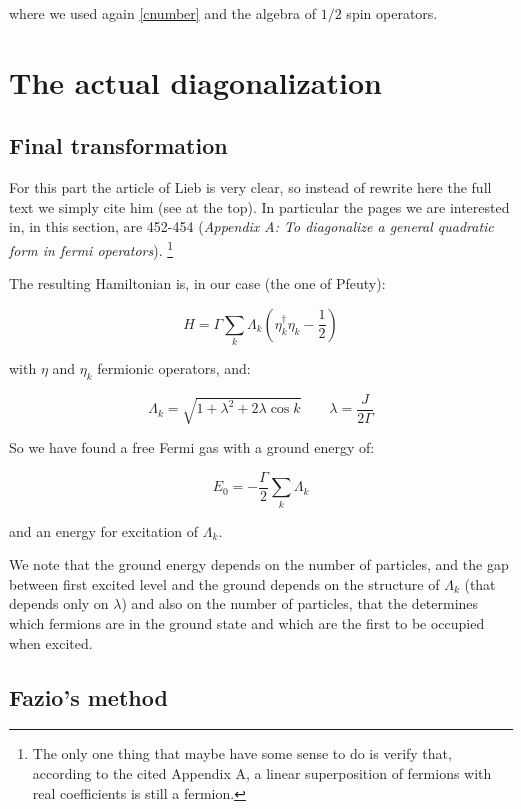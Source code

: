 \documentclass[a4paper,10pt]{article}
\begin{document}
\noindent where we used again \cref{cnumber} and the algebra of $1/2$ spin operators.

\section{The actual diagonalization}

\subsection{Final transformation}

For this part the article of Lieb is very clear, so instead of rewrite here the full text we simply cite him (see at the top). In particular the pages we are interested in, in this section, are 452-454 (\textit{Appendix A: To diagonalize a general quadratic form in fermi operators}).
\footnote{The only one thing that maybe have some sense to do is verify that, according to the cited Appendix A, a linear superposition of fermions with real coefficients is still a fermion.}

The resulting Hamiltonian is, in our case (the one of Pfeuty):

\begin{equation}
H = \Gamma \sum_k \Lambda_k (\eta_k^\dagger \eta_k - \frac{1}{2})
\end{equation}

\noindent with $\eta$ and $\eta_k$ fermionic operators, and:

\begin{equation}
\Lambda_k = \sqrt{1 + \lambda^2 + 2\lambda \cos k}	\qquad	\lambda = \frac{J}{2 \Gamma}
\end{equation}

So we have found a free Fermi gas with a ground energy of:

\begin{equation}
	E_0 = - \frac{\Gamma}{2} \sum_k \Lambda_k
\end{equation}

\noindent and an energy for excitation of $\Lambda_k$.

We note that the ground energy depends on the number of particles, and the gap between first excited level and the ground depends on the structure of $\Lambda_k$ (that depends only on $\lambda$) and also on the number of particles, that the determines which fermions are in the ground state and which are the first to be occupied when excited.

\subsection{Fazio's method}
\end{document}
